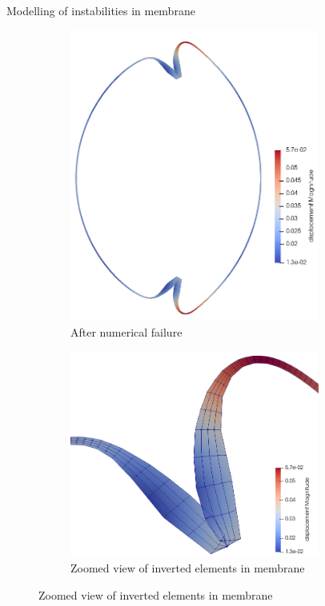 \documentclass{beamer}
\begin{document}
\begin{frame}{Modelling of instabilities in membrane}
{\begin{figure}[h]
\begin{subfigure}{0.3\textwidth}
\includegraphics[width=0.9\textwidth]{instab_test_1_membrane_inv_cells.png}
\caption{After numerical failure}
\end{subfigure}
\begin{subfigure}{0.38\textwidth}
\centering
\includegraphics[width=0.9\textwidth]{instab_test_1_membrane_disp.png}
\caption{Zoomed view of inverted elements in membrane}
\end{subfigure}

\end{figure}}
\end{frame}
\end{document}
